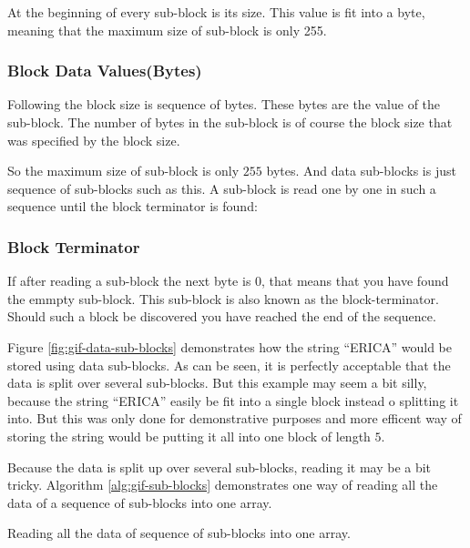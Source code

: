 \begin{refsection}
  At the beginning of every sub-block is its size. This value is fit
  into a byte, meaning that the maximum size of sub-block is only
  255.

  \subsubsection*{Block Data Values(Bytes)}

  Following the block size is sequence of bytes. These bytes are the
  value of the sub-block. The number of bytes in the sub-block is of
  course the block size that was specified by the block size.

  So the maximum size of sub-block is only $255$ bytes. And data
  sub-blocks is just sequence of sub-blocks such as this. A sub-block
  is read one by one in such a sequence until the block terminator is found:

  \subsubsection*{Block Terminator}

  If after reading a sub-block the next byte is 0, that means that you
  have found the emmpty sub-block. This sub-block is also known as the
  block-terminator. Should such a block be discovered you have reached
  the end of the sequence.

  Figure \ref{fig:gif-data-sub-blocks} demonstrates how the string
  ``ERICA'' would be stored using data sub-blocks. As can be seen, it
  is perfectly acceptable that the data is split over several
  sub-blocks. But this example may seem a bit silly, because the
  string ``ERICA'' easily be fit into a single block instead o
  splitting it into. But this was only done for demonstrative purposes
  and more efficent way of storing the string would be putting it all
  into one block of length $5$.

  Because the data is split up over several sub-blocks, reading it may
  be a bit tricky. Algorithm \ref{alg:gif-sub-blocks} demonstrates one way of reading all the
  data of a sequence of sub-blocks into one array.

  \begin{algorithm}[H]
    \caption{Reading all the data of sequence of sub-blocks into one array.}
    \label{alg:gif-sub-blocks}
    \begin{algorithmic}[1]
      \Repeat
        \EndRepeatn


\end{algorithmic}
\end{algorithm}
\end{refsection}
